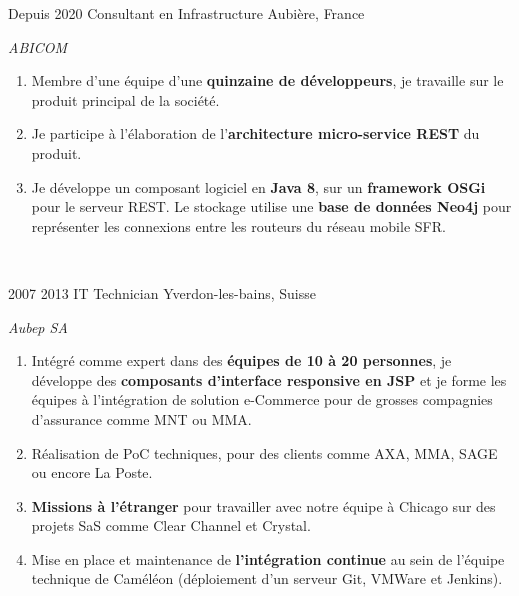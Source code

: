 \documentclass{friggeri-cv} 	%
\begin{document}
\begin{entrylist}
\entry
{Depuis 2020}
{Consultant en Infrastructure}
{Aubière, France}
{\vspace{-0.4cm}\emph{ABICOM} \\
\begin{enumerate}[leftmargin=-1cm]
    \item Membre d’une équipe d’une \textbf{quinzaine de développeurs}, je travaille sur le produit principal de la société.
    \item Je participe à l’élaboration de l’\textbf{architecture micro-service REST} du produit.
    \item Je développe un composant logiciel en \textbf{Java 8}, sur un \textbf{framework OSGi} pour le serveur REST. 
        Le stockage utilise une \textbf{base de données Neo4j} pour représenter les connexions entre les routeurs du réseau mobile SFR.
\end{enumerate}
\
}
\end{entrylist}
\begin{entrylist}
\entry
{2007  2013}
{IT Technician}
{Yverdon-les-bains, Suisse}
{\vspace{-0.4cm}\emph{Aubep SA} \\
\begin{enumerate}[leftmargin=-1cm]
\item Intégré comme expert dans des \textbf{équipes de 10 à 20 personnes}, je développe des \textbf{composants d’interface responsive en JSP} et je forme les équipes à l’intégration de solution e-Commerce pour de grosses compagnies d’assurance comme MNT ou MMA.
\item Réalisation de PoC techniques, pour des clients comme AXA, MMA, SAGE ou encore La Poste.
\item \textbf{Missions à l’étranger} pour travailler avec notre équipe à Chicago sur des projets SaS comme Clear Channel et Crystal.
\item Mise en place et maintenance de \textbf{l’intégration continue} au sein de l’équipe technique de Caméléon (déploiement d’un serveur Git, VMWare et Jenkins).
\end{enumerate}
\
}
\end{entrylist}
\end{document}
